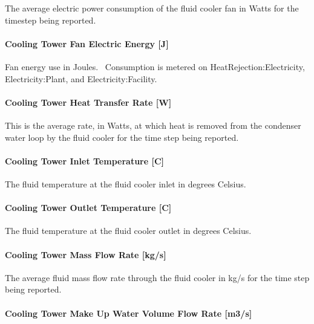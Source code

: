 The average electric power consumption of the fluid cooler fan in Watts for the timestep being reported.

\paragraph{Cooling Tower Fan Electric Energy {[}J{]}}\label{cooling-tower-fan-electric-energy-j-5}

Fan energy use in Joules.~ Consumption is metered on HeatRejection:Electricity, Electricity:Plant, and Electricity:Facility.

\paragraph{Cooling Tower Heat Transfer Rate {[}W{]}}\label{cooling-tower-heat-transfer-rate-w-5}

This is the average rate, in Watts, at which heat is removed from the condenser water loop by the fluid cooler for the time step being reported.

\paragraph{Cooling Tower Inlet Temperature {[}C{]}}\label{cooling-tower-inlet-temperature-c-5}

The fluid temperature at the fluid cooler inlet in degrees Celsius.

\paragraph{Cooling Tower Outlet Temperature {[}C{]}}\label{cooling-tower-outlet-temperature-c-5}

The fluid temperature at the fluid cooler outlet in degrees Celsius.

\paragraph{Cooling Tower Mass Flow Rate {[}kg/s{]}}\label{cooling-tower-mass-flow-rate-kgs-5}

The average fluid mass flow rate through the fluid cooler in kg/s for the time step being reported.

\paragraph{Cooling Tower Make Up Water Volume Flow Rate {[}m3/s{]}}\label{cooling-tower-make-up-water-volume-flow-rate-m3s-5}

